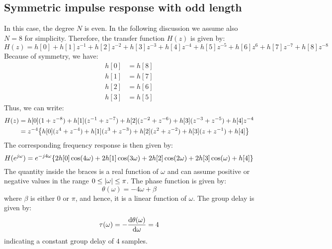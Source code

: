 \documentclass[../../main/main.tex]{subfiles}
\begin{document}
\subsection{Symmetric impulse response with odd length}
In this case, the degree \( N \) is even. In the following discussion we assume also \( N = 8 \) for simplicity. Therefore, the transfer function \( H(z) \) is given by:
\begin{equation}
    H(z)
    =
    h[0] + h[1]z^{-1} + h[2]z^{-2} + h[3]z^{-3} + h[4]z^{-4} + h[5]z^{-5} + h[6]z^{6} + h[7]z^{-7} + h[8]z^{-8}
    \label{eq:L20_S15_1}
\end{equation}
Because of symmetry, we have:
\begin{align}
    h[0] &= h[8]    \\
    h[1] &= h[7]    \\
    h[2] &= h[6]    \\
    h[3] &= h[5]
\end{align}
Thus, we can write:
\begin{align}
    H(z)
    &=
        h[0](1 + z^{-8}) + h[1](z^{-1} + z^{-7}) + h[2](z^{-2} + z^{-6}) + h[3](z^{-3} + z^{-5}) + h[4]z^{-4}   \nonumber   \\
    &=
        z^{-4} \qty{h[0](z^{4} + z^{-4}) + h[1](z^{3} + z^{-3}) + h[2](z^{2} + z^{-2}) + h[3](z + z^{-1}) + h[4]}
\end{align}
%
The corresponding frequency response is then given by:
\begin{equation}
    H(e^{j\omega})
    =
    e^{-j4\omega} \qty{2h[0]\cos(4\omega) + 2h[1]\cos(3\omega) + 2h[2]\cos(2\omega) + 2h[3]\cos(\omega) + h[4]}
    \label{eq:L20_S17_1}
\end{equation}
The quantity inside the braces is a real function of \( \omega \) and can assume positive or negative values in the range \( 0 \le \abs{\omega} \le \pi \). The phase function is given by:%
\begin{equation}
    \theta(\omega)
    =
    -4\omega + \beta
    \label{eq:L20_S18_1}
\end{equation}
where \( \beta \) is either \( 0 \) or \( \pi \), and hence, it is a linear function of \( \omega \). The group delay is given by:%
\begin{equation}
    \tau(\omega)
    =
    - \dv{\theta(\omega)}{\omega}
    =
    4
    \label{eq:L20_S18_2}
\end{equation}
indicating a constant group delay of \( 4 \) samples.
\end{document}
